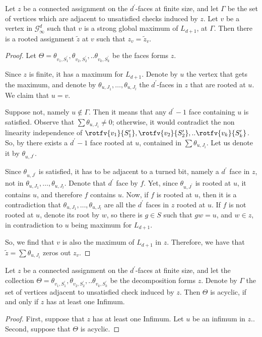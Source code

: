 \begin{claim}
  Let $z$ be a connected assignment on the $d^{\prime}$-faces at finite size, and let $\Gamma$ be the set of vertices which are adjacent to unsatisfied checks induced by $z$. Let $v$ be a vertex in $\mathcal{G}^{d}_{\infty}$ such that $v$ is a strong global maximum of $L_{d+1}$, at $\Gamma$. Then there is a rooted assignment $\tilde{z}$ at $v$ such that $z_{v} = \tilde{z}_{v}$. 
\end{claim}
\begin{proof}
  Let $ \Theta = \theta_{v_{1},S^{\prime}_{1}}, \theta_{v_{2},S^{\prime}_{2}},.. \theta_{v_{k},S^{\prime}_{k}}$ be the faces forms $z$. 


  Since $z$ is finite, it has a maximum for $L_{d+1}$. Denote by $u$ the vertex that gets the maximum, and denote by $\theta_{u,J_{1}}, \ldots, \theta_{u,J_{l}}$ the $d^{\prime}$-faces in $z$ that are rooted at $u$. We claim that $u = v$.

  Suppose not, namely $u \notin \Gamma$. Then it means that any $d^{\prime}-1$ face containing $u$ is satisfied. Observe that $\sum \theta_{u,J_{i}} \neq 0$; otherwise, it would contradict the non linearity independence of  $\rotfv{v_{1}}{S^{\prime}_{1}}, \rotfv{v_{2}}{S^{\prime}_{2}},.. \rotfv{v_{k}}{S^{\prime}_{k}}$. So, by  there exists a $d^{\prime}-1$ face rooted at $u$, contained in $\sum \theta_{u,J_{i}}$. Let us denote it by $\theta_{u,J^{\prime}}$.

Since $\theta_{u,J^{\prime}}$ is satisfied, it has to be adjacent to a turned bit, namely a $d^{\prime}$ face in $z$, not in $\theta_{u,J_{1}}, \ldots, \theta_{u,J_{l}}$. Denote that $d^{\prime}$ face by $f$. Yet, since $\theta_{u,J^{\prime}}$ is rooted at $u$, it contains $u$, and therefore $f$ contains $u$. Now, if $f$ is rooted at $u$, then it is a contradiction that $\theta_{u,J_{1}}, \ldots, \theta_{u,J_{l}}$ are all the $d^{\prime}$ faces in $z$ rooted at $u$. If $f$ is not rooted at $u$, denote its root by $w$, so there is $g \in S$ such that $gw = u$, and $w \in z$, in contradiction to $u$ being maximum for $L_{d+1}$.


So, we find that $v$ is also the maximum of $L_{d+1}$ in $z$. Therefore, we have that $\tilde{z} = \sum \theta_{u, J_{i}}$ zeros out $z_{v}$.
\end{proof}





\begin{claim}
  Let $z$ be a connected assignment on the $d^{\prime}$-faces at finite size, and let the collection $\Theta = \theta_{v_{1},S^{\prime}_{1}}, \theta_{v_{2},S^{\prime}_{2}},.. \theta_{v_{k},S^{\prime}_{k}}$ be the decomposition forms $z$. Denote by $\Gamma$ the set of vertices adjacent to unsatisfied check induced by $z$. Then $\Theta$ is acyclic, if and only if $z$ has at least one Infimum. 
\end{claim}
\begin{proof}
  First, suppose that $z$ has at least one Infimum. Let $u$ be an infimum in $z$.. 
  Second, suppose that $\Theta$ is acyclic. 
\end{proof}



